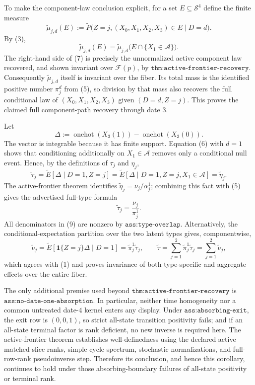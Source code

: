 To make the component-law conclusion explicit, for a set \(E\subseteq\mathcal S^4\) define the finite measure
\[
 \widetilde\mu_{j,d}(E)
 :=\widetilde P\bigl(Z=j,(X_0,X_1,X_2,X_3)\in E\mid D=d\bigr).
\]
By (3),
\[
 \widetilde\mu_{j,d}(E)
 =\widetilde\mu_{j,d}\bigl(E\cap\{X_1\in\mathcal A\}\bigr). \tag{7}
\]
The right-hand side of (7) is precisely the unnormalized active component law recovered, and shown invariant over \(\mathcal F(p)\), by \(\texttt{thm:active-frontier-recovery}\).  Consequently \(\widetilde\mu_{j,d}\) itself is invariant over the fiber.  Its total mass is the identified positive number \(\pi_j^d\) from (5), so division by that mass also recovers the full conditional law of \((X_0,X_1,X_2,X_3)\) given \((D=d,Z=j)\).  This proves the claimed full component-path recovery through date \(3\).

Let
\[
 \Delta:=\operatorname{onehot}(X_3(1))-\operatorname{onehot}(X_3(0)).
\]
The vector is integrable because it has finite support.  Equation (6) with \(d=1\) shows that conditioning additionally on \(X_1\in\mathcal A\) removes only a conditional null event.  Hence, by the definitions of \(\tau_j\) and \(\eta_j\),
\[
 \widetilde\tau_j
 =\widetilde E[\Delta\mid D=1,Z=j]
 =\widetilde E[\Delta\mid D=1,Z=j,X_1\in\mathcal A]
 =\widetilde\eta_j.                                       \tag{8}
\]
The active-frontier theorem identifies \(\widetilde\eta_j=\nu_j/\alpha_j^1\); combining this fact with (5) gives the advertised full-type formula
\[
 \widetilde\tau_j=\frac{\nu_j}{\pi_j^1}.                  \tag{9}
\]
All denominators in (9) are nonzero by \(\texttt{ass:type-overlap}\).  Alternatively, the conditional-expectation partition over the two latent types gives, componentwise,
\[
 \widetilde\nu_j
 =\widetilde E[\mathbf 1\{Z=j\}\Delta\mid D=1]
 =\widetilde\pi_j^1\widetilde\tau_j,
 \qquad
 \widetilde\tau=\sum_{j=1}^2\widetilde\pi_j^1\widetilde\tau_j
 =\sum_{j=1}^2\widetilde\nu_j,                            \tag{10}
\]
which agrees with (1) and proves invariance of both type-specific and aggregate effects over the entire fiber.

The only additional premise used beyond \(\texttt{thm:active-frontier-recovery}\) is \(\texttt{ass:no-date-one-absorption}\).  In particular, neither time homogeneity nor a common untreated date-\(4\) kernel enters any display.  Under \(\texttt{ass:absorbing-exit}\), the exit row is \((0,0,1)\), so strict all-state transition positivity fails; and if an all-state terminal factor is rank deficient, no new inverse is required here.  The active-frontier theorem establishes well-definedness using the declared active matched-slice ranks, simple cycle spectrum, stochastic normalizations, and full-row-rank pseudoinverse step.  Therefore its conclusion, and hence this corollary, continues to hold under those absorbing-boundary failures of all-state positivity or terminal rank.
